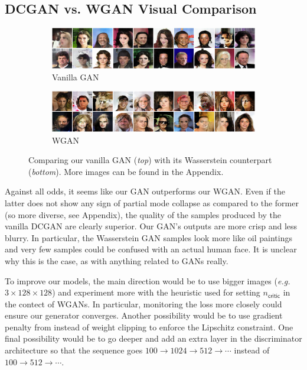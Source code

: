 \documentclass[table]{article}
\begin{document}
\subsection{DCGAN vs. WGAN Visual Comparison}
\begin{figure}[ht]
  \centering
  \begin{subfigure}{\textwidth}
    \centering
    \includegraphics[scale=0.5]{imgs/gan_examples}
    \caption{Vanilla GAN}
  \end{subfigure}

  \vspace*{3mm}
  \begin{subfigure}{\textwidth}
    \centering
    \includegraphics[scale=0.5]{imgs/wgan_examples}
    \caption{WGAN}
  \end{subfigure}
  \caption{Comparing our vanilla GAN (\textit{top}) with its Wasserstein counterpart (\textit{bottom}). More images can be found in the Appendix.}
    \label{compare}
\end{figure}

Against all odds, it seems like our GAN outperforms our WGAN. Even if the latter does not show any sign of partial mode collapse as compared to the former (so more diverse, see Appendix), the quality of the samples produced by the vanilla DCGAN are clearly superior. Our GAN's outputs are more crisp and less blurry. In particular, the Wasserstein GAN samples look more like oil paintings and very few samples could be confused with an actual human face. It is unclear why this is the case, as with anything related to GANs really.

To improve our models, the main direction would be to use bigger images (\textit{e.g.} $3 \times 128 \times 128$) and experiment more with the heuristic used for setting $n_\textsf{critic}$ in the contect of WGANs. In particular, monitoring the loss more closely could ensure our generator converges. Another possibility would be to use gradient penalty from \cite{wgangp} instead of weight clipping to enforce the Lipschitz constraint. One final possibility would be to go deeper and add an extra layer in the discriminator architecture so that the sequence goes $100 \to 1024 \to 512 \to \cdots$ instead of $100 \to 512 \to \cdots$.
\end{document}
